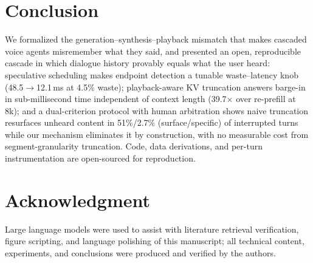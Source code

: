 \documentclass[conference]{IEEEtran}
\begin{document}
\section{Conclusion}
We formalized the generation--synthesis--playback mismatch that makes cascaded voice agents misremember what they said, and presented an open, reproducible cascade in which dialogue history provably equals what the user heard: speculative scheduling makes endpoint detection a tunable waste--latency knob (48.5$\rightarrow$12.1\,ms at 4.5\% waste); playback-aware KV truncation answers barge-in in sub-millisecond time independent of context length (39.7$\times$ over re-prefill at 8k); and a dual-criterion protocol with human arbitration shows naive truncation resurfaces unheard content in 51\%/2.7\% (surface/specific) of interrupted turns while our mechanism eliminates it by construction, with no measurable cost from segment-granularity truncation. Code, data derivations, and per-turn instrumentation are open-sourced for reproduction.

\section*{Acknowledgment}
Large language models were used to assist with literature retrieval verification, figure scripting, and language polishing of this manuscript; all technical content, experiments, and conclusions were produced and verified by the authors.



\end{document}
